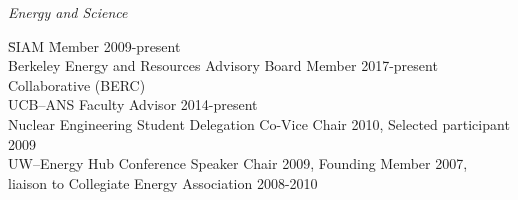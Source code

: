 \textit{Energy and Science}
\begin{tabbing}
\hspace*{2 em}\= SIAM  \hspace*{15em} \= Member 2009-present\\
%
\> Berkeley Energy and Resources \> Advisory Board Member 2017-present \\
\> \hspace*{2 em} Collaborative (BERC) \\
%
\> UCB--ANS \> Faculty Advisor 2014-present  \\
%
%
%
\> Nuclear Engineering Student Delegation \> Co-Vice Chair 2010, Selected participant 2009\\
%
\> UW--Energy Hub \> Conference Speaker Chair 2009, Founding Member 2007,  \\ \> \> liaison to Collegiate Energy Association 2008-2010\\
%
%
%
\end{tabbing}

